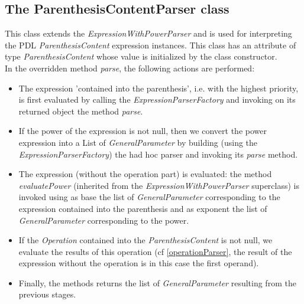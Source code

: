 \documentclass[a4paper,11pt] {ivoa}
\begin{document}
\subsection{The ParenthesisContentParser class}
This class extends the {\it ExpressionWithPowerParser} and is used for interpreting the PDL {\it  ParenthesisContent} expression instances. This class has an attribute of type {\it ParenthesisContent} whose value is initialized by the class constructor.\\
In the overridden method {\it parse}, the following actions are performed:
\begin{itemize}
\item The expression 'contained into the parenthesis', i.e. with the highest priority, is first evaluated by calling the {\it ExpressionParserFactory} and invoking on its returned object the method {\it parse}.
\item  If the power of the expression is not null, then we convert the power expression into a List of {\it GeneralParameter} by building (using the {\it ExpressionParserFactory}) the had hoc parser and invoking its {\it parse} method.
\item The expression (without the operation part) is evaluated:  the method {\it evaluatePower} (inherited from the {\it ExpressionWithPowerParser} superclass) is invoked using as base the list of {\it GeneralParameter} corresponding to the expression contained into the parenthesis and as exponent the list of {\it GeneralParameter} corresponding to the power.
\item  If the {\it Operation} contained into the {\it ParenthesisContent}  is not null, we evaluate the results of this operation (cf \ref{operationParser}, the result of the expression without the operation is in this case the first operand).
\item Finally, the methods returns the list of {\it GeneralParameter} resulting from the previous stages.
\end{itemize}
\end{document}
